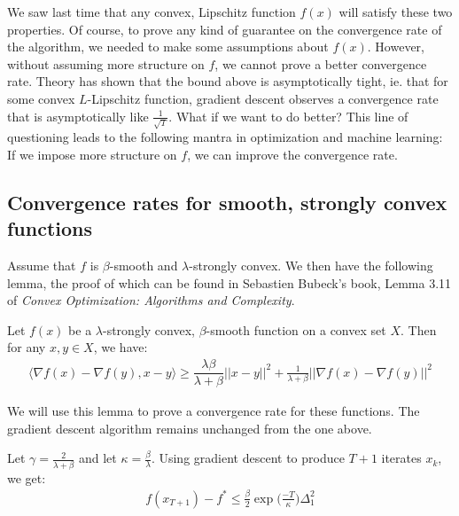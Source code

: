 \documentclass[12pt]{report}
\begin{document}
We saw last time that any convex, Lipschitz function $f(x)$ will satisfy these two properties. Of course, to prove any kind of guarantee on the convergence rate of the algorithm, we needed to make some assumptions about $f(x)$. However, without assuming more structure on $f$, we cannot prove a better convergence rate. Theory has shown that the bound above is asymptotically tight, ie. that for some convex $L$-Lipschitz function, gradient descent observes a convergence rate that is asymptotically like $\frac{1}{\sqrt{T}}$. What if we want to do better? This line of questioning leads to the following mantra in optimization and machine learning: If we impose more structure on $f$, we can improve the convergence rate.

\subsection{Convergence rates for smooth, strongly convex functions}

Assume that $f$ is $\beta$-smooth and $\lambda$-strongly convex. We then have the following lemma, the proof of which can be found in Sebastien Bubeck's book, Lemma 3.11 of {\it Convex Optimization: Algorithms and Complexity}.

\begin{lemma}
Let $f(x)$ be a $\lambda$-strongly convex, $\beta$-smooth function on a convex set $X$. Then for any $x,y \in X$, we have:
\begin{align*}
\langle \nabla f(x) - \nabla f(y) , x-y \rangle \geq \dfrac{\lambda\beta}{\lambda+\beta}||x-y||^2 + \frac{1}{\lambda+\beta}||\nabla f(x) - \nabla f(y)||^2\end{align*}
\end{lemma}

We will use this lemma to prove a convergence rate for these functions. The gradient descent algorithm remains unchanged from the one above.

\begin{theorem}
Let $\gamma = \frac{2}{\lambda + \beta}$ and let $\kappa = \frac{\beta}{\lambda}$. Using gradient descent to produce $T+1$ iterates $x_k$, we get:
\begin{align*}
f(x_{T+1}) - f^* \leq \frac{\beta}{2}\exp\bigg(\frac{-T}{\kappa}\bigg)\Delta_1^2\end{align*}
\end{theorem}
\end{document}
